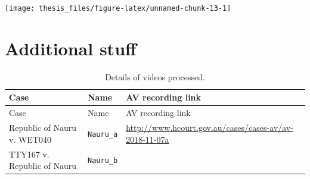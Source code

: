 \documentclass{monashthesis}
\begin{document}
\texttt{[image: thesis\_files/figure-latex/unnamed-chunk-13-1]}

\appendix

\hypertarget{additional-stuff}{%
\chapter{Additional stuff}\label{additional-stuff}}

\begin{longtable}[]{@{}lll@{}}
\caption{Details of videos processed.}\tabularnewline
\toprule
\begin{minipage}[b]{0.42\columnwidth}\raggedright
Case\strut
\end{minipage} & \begin{minipage}[b]{0.14\columnwidth}\raggedright
Name\strut
\end{minipage} & \begin{minipage}[b]{0.35\columnwidth}\raggedright
AV recording link\strut
\end{minipage}\tabularnewline
\midrule
\endfirsthead
\toprule
\begin{minipage}[b]{0.42\columnwidth}\raggedright
Case\strut
\end{minipage} & \begin{minipage}[b]{0.14\columnwidth}\raggedright
Name\strut
\end{minipage} & \begin{minipage}[b]{0.35\columnwidth}\raggedright
AV recording link\strut
\end{minipage}\tabularnewline
\midrule
\endhead
\begin{minipage}[t]{0.42\columnwidth}\raggedright
Republic of Nauru v. WET040\strut
\end{minipage} & \begin{minipage}[t]{0.14\columnwidth}\raggedright
\texttt{Nauru\_a}\strut
\end{minipage} & \begin{minipage}[t]{0.35\columnwidth}\raggedright
\url{http://www.hcourt.gov.au/cases/cases-av/av-2018-11-07a}\strut
\end{minipage}\tabularnewline
\begin{minipage}[t]{0.42\columnwidth}\raggedright
TTY167 v. Republic of Nauru\strut
\end{minipage} & \begin{minipage}[t]{0.14\columnwidth}\raggedright
\texttt{Nauru\_b}\strut
\end{minipage} & \begin{minipage}[t]{0.35\columnwidth}\raggedright

\end{minipage}
\end{longtable}
\end{document}
